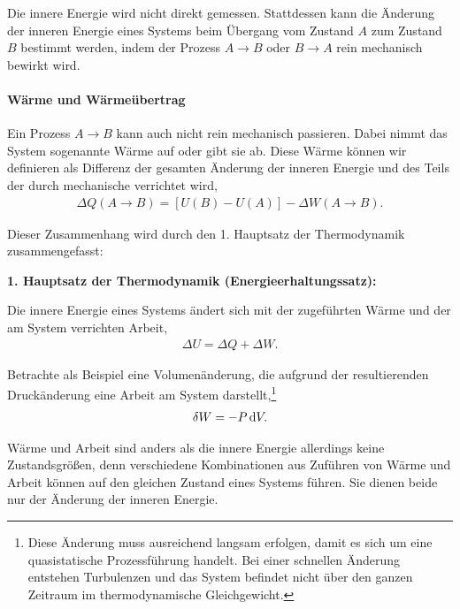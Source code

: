 \begin{formal}
    Die innere Energie wird nicht direkt gemessen. Stattdessen kann die Änderung der inneren Energie eines Systems beim Übergang vom Zustand $A$ zum Zustand $B$ bestimmt werden, indem der Prozess $A\rightarrow B$ oder $B\rightarrow A$ rein mechanisch bewirkt wird.
\end{formal}



\paragraph*{Wärme und Wärmeübertrag}

Ein Prozess $A\rightarrow B$ kann auch nicht rein mechanisch passieren. Dabei nimmt das System sogenannte Wärme auf oder gibt sie ab. Diese Wärme können wir definieren als Differenz der gesamten Änderung der inneren Energie und des Teils der durch mechanische verrichtet wird,
\begin{align*}
    \Delta Q(A\rightarrow B) = [U(B)-U(A)] - \Delta W(A\rightarrow B).
\end{align*}

Dieser Zusammenhang wird durch den 1. Hauptsatz der Thermodynamik zusammengefasst:
\begin{formal}
    \textbf{1. Hauptsatz der Thermodynamik (Energieerhaltungssatz):}

    Die innere Energie eines Systems ändert sich mit der zugeführten Wärme und der am System verrichten Arbeit,
    \begin{align*}
        \Delta U = \Delta Q + \Delta W.
    \end{align*}
\end{formal}

Betrachte als Beispiel eine Volumenänderung, die aufgrund der resultierenden Druckänderung eine Arbeit am System darstellt,\footnote{Diese Änderung muss ausreichend langsam erfolgen, damit es sich um eine quasistatische Prozessführung handelt. Bei einer schnellen Änderung entstehen Turbulenzen und das System befindet nicht über den ganzen Zeitraum im thermodynamische Gleichgewicht.}
\begin{align*}
    \mathop{}\!\mathrm{\delta} W = -P\mathop{}\!\mathrm{d} V.
\end{align*}

Wärme und Arbeit sind anders als die innere Energie allerdings keine Zustandsgrößen, denn verschiedene Kombinationen aus Zuführen von Wärme und Arbeit können auf den gleichen Zustand eines Systems führen. Sie dienen beide nur der Änderung der inneren Energie.

